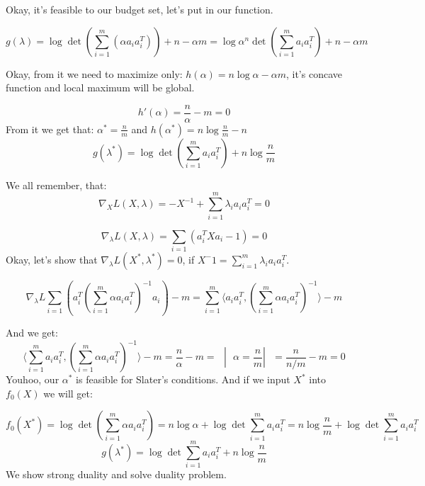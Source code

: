 \begin{enumerate}
Okay, it's feasible to our budget set, let's put in our function.

\begin{equation*}
    g(\lambda) = \log \det \left(\sum\limits_{i=1}^m(\alpha a_ia_i^T) \right) + n - \alpha m = 
    \log \alpha^n \det \left(\sum\limits_{i=1}^m a_ia_i^T \right) + n - \alpha m
\end{equation*}

Okay, from it we need to maximize only: $h(\alpha) = n \log \alpha - \alpha m$, it's concave function and local maximum will be global.

\begin{equation*}
    h'(\alpha) = \frac{n}{\alpha} - m = 0
\end{equation*}
From it we get that: $\alpha^* = \frac{n}{m}$ and $h(\alpha^*) = n \log \frac{n}{m} - n$
\begin{equation*}
    g(\lambda^*) = \log \det \left(\sum\limits_{i=1}^m a_ia_i^T \right) + n \log \frac{n}{m}
\end{equation*}

We all remember, that:
\begin{equation*}
    \nabla_X L(X, \lambda) = -X^{-1} + \sum\limits_{i=1}^m \lambda_i a_ia_i^T = 0
\end{equation*}

\begin{equation*}
    \nabla_{\lambda} L(X, \lambda) = \sum\limits_{i=1} (a_i^TXa_i - 1) = 0
\end{equation*}
Okay, let's show that $\nabla_{\lambda} L(X^*, \lambda^*) = 0$, if $X^-1 = \sum\limits_{i=1}^m \lambda_i a_ia_i^T$.

\begin{equation*}
    \nabla_{\lambda} L \sum\limits_{i=1}(a_i^T \left( \sum\limits_{i=1}^m \alpha a_ia_i^T \right)^{-1} a_i) - m = 
    \sum_{i=1}^m \langle a_ia_i^T, \left( \sum\limits_{i=1}^m \alpha a_ia_i^T \right)^{-1} \rangle - m 
\end{equation*}

And we get:
\begin{equation*}
    \langle \sum_{i=1}^m  a_ia_i^T,  \left( \sum\limits_{i=1}^m \alpha a_ia_i^T \right)^{-1} \rangle - m = \frac{n}{\alpha} - m = \text{ } | \text{ } \alpha = \frac{n}{m} | \text{ } = \frac{n}{n/m} - m = 0
\end{equation*}
Youhoo, our $\alpha^*$ is feasible for Slater's conditions. And if we input $X^*$ into $f_0(X)$ we will get:

\begin{equation*}
    f_0(X^*) = \log \det (\sum\limits_{i=1}^m \alpha a_ia_i^T) = n \log \alpha + \log \det \sum\limits_{i=1}^m a_ia_i^T  = n \log \frac{n}{m} + \log \det \sum\limits_{i=1}^m a_ia_i^T
\end{equation*}
\begin{equation*}
    g(\lambda^*) =  \log \det \sum\limits_{i=1}^m a_ia_i^T  + n \log \frac{n}{m}
\end{equation*}
We show strong duality and solve duality problem.

\end{enumerate}

